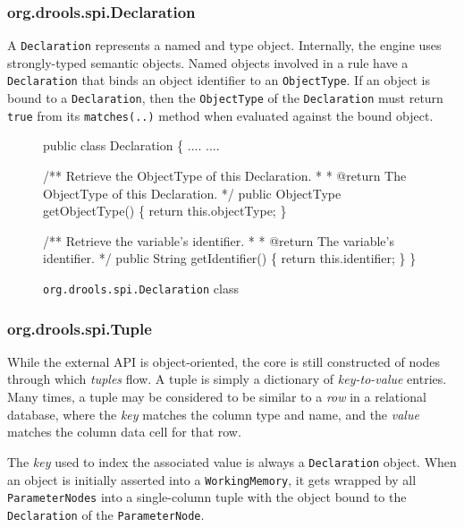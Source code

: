 \subsubsection{org.drools.spi.Declaration}

A \verb|Declaration| represents a named and type object.  Internally,
the \drools{} engine uses strongly-typed semantic objects.  Named objects
involved in a rule have a \verb|Declaration| that binds an object
identifier to an \verb|ObjectType|.  If an object is bound to a
\verb|Declaration|, then the \verb|ObjectType| of the \verb|Declaration|
must return \verb|true| from its \verb|matches(..)| method when
evaluated against the bound object.

\begin{figure}
\begin{codelisting}
public class Declaration
\{
    ....
    ....

    /** Retrieve the ObjectType of this Declaration.
     *
     *  @return The ObjectType of this Declaration.
     */
    public ObjectType getObjectType()
    \{
        return this.objectType;
    \}

    /** Retrieve the variable's identifier.
     *
     *  @return The variable's identifier.
     */
    public String getIdentifier()
    \{
        return this.identifier;
    \}
\}
\end{codelisting}
\label{code.Declaration}
\caption{\texttt{org.drools.spi.Declaration} class}
\end{figure}

\subsubsection{org.drools.spi.Tuple}

While the external \drools{} API is object-oriented, the core is still
constructed of nodes through which \emph{tuples} flow.  A tuple is
simply a dictionary of \emph{key-to-value} entries.  Many times, a
tuple may be considered to be similar to a \emph{row} in a relational
database, where the \emph{key} matches the column type and name, and
the \emph{value} matches the column data cell for that row.  

The \emph{key} used to index the associated value is always a
\verb|Declaration| object. When an object is initially asserted into a
\verb|WorkingMemory|, it gets wrapped by all \verb|ParameterNodes|
into a single-column tuple with the object bound to the
\verb|Declaration| of the \verb|ParameterNode|.

